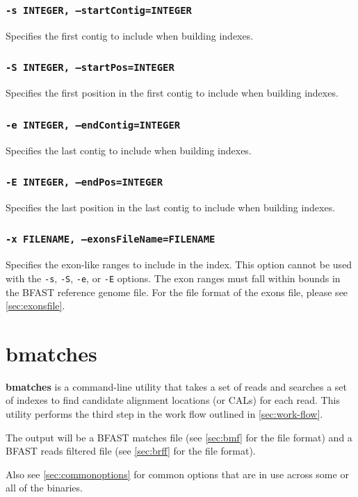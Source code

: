 \documentclass[a4paper,12pt]{book}
\newcommand{\TT}[1]{{\tt #1}} %
\newcommand{\BF}[1]{{\bf #1}} %
\newcommand{\BRGF}{BFAST reference genome file} %
\newcommand{\BMF}{BFAST matches file} %
\newcommand{\BRFF}{BFAST reads filtered file} %
\begin{document}
\subsubsection{\TT{-s INTEGER, --startContig=INTEGER}}
Specifies the first contig to include when building indexes.

\subsubsection{\TT{-S INTEGER, --startPos=INTEGER}}
Specifies the first position in the first contig to include when building indexes.

\subsubsection{\TT{-e INTEGER, --endContig=INTEGER}}
Specifies the last contig to include when building indexes.

\subsubsection{\TT{-E INTEGER, --endPos=INTEGER}}
Specifies the last position in the last contig to include when building indexes.

\subsubsection{\TT{-x FILENAME, --exonsFileName=FILENAME}}
Specifies the exon-like ranges to include in the index.
This option cannot be used with the \TT{-s}, \TT{-S}, \TT{-e}, or \TT{-E} options.
The exon ranges must fall within bounds in the \BRGF{}.
For the file format of the exons file, please see \autoref{sec:exonsfile}.

\section{bmatches}
\label{sec:bmatches}
\BF{bmatches} is a command-line utility that takes a set of reads and searches a set of indexes to find candidate alignment locations (or CALs) for each read.
This utility performs the third step in the work flow outlined in \autoref{sec:work-flow}.

The output will be a \BMF{} (see \autoref{sec:bmf} for the file format) and a \BRFF{} (see \autoref{sec:brff} for the file format).

Also see \autoref{sec:commonoptions} for common options that are in use across some or all of the binaries.
\end{document}
